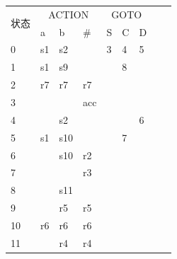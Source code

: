 \documentclass[UTF8]{ctexart} %
\begin{document}
\begin{table}[H]
    \centering
    \begin{tabular}{|p{2cm}<{\centering}|p{1cm}<{\centering}|p{1cm}<{\centering}|p{1cm}<{\centering}|p{1cm}<{\centering}|p{1cm}<{\centering}|p{1cm}<{\centering}|p{1cm}<{\centering}|p{1cm}<{\centering}|}
        \hline
        \multirow{2}{*}{状态} & \multicolumn{3}{c|}{ACTION} & \multicolumn{3}{c|}{GOTO}                   \\
        \cline{2-7}
        ~                   & a                           & b                         & \#  & S & C & D \\
        \hline
        0                   & s1                          & s2                        &     & 3 & 4 & 5 \\
        \hline
        1                   & s1                          & s9                        &     &   & 8 &   \\
        \hline
        2                   & r7                          & r7                        & r7  &   &   &   \\
        \hline
        3                   &                             &                           & acc &   &   &   \\
        \hline
        4                   &                             & s2                        &     &   &   & 6 \\
        \hline
        5                   & s1                          & s10                       &     &   & 7 &   \\
        \hline
        6                   &                             & s10                       & r2  &   &   &   \\
        \hline
        7                   &                             &                           & r3  &   &   &   \\
        \hline
        8                   &                             & s11                       &     &   &   &   \\
        \hline
        9                   &                             & r5                        & r5  &   &   &   \\
        \hline
        10                  & r6                          & r6                        & r6  &   &   &   \\
        \hline
        11                  &                             & r4                        & r4  &   &   &   \\
        \hline
    \end{tabular}
\end{table}
\end{document}
